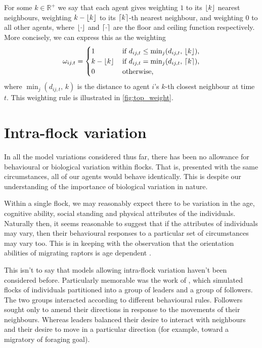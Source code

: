 For some $k\in\mathbb{R}^+$ we say that each agent gives weighting $1$ to its
$\lfloor k\rfloor$ nearest neighbours, weighting $k - \lfloor k\rfloor$ to its $\lceil k\rceil$-th
nearest neighbour, and weighting $0$ to all other agents, where $\lfloor\cdot\rfloor$
and $\lceil\cdot\rceil$ are the floor and ceiling function respectively. More
concisely, we can express this as the weighting
\begin{equation}
    \label{eq:top_interaction}
	\omega_{ij,t} =
	\begin{cases}
		1           & \, \text{if } d_{ij, t} \leq \min_j(d_{ij,t},\, \lfloor k\rfloor), \\
		k-\lfloor k\rfloor & \, \text{if } d_{ij, t} = \min_j(d_{ij,t},\, \lceil k\rceil),     \\
		0           & \, \text{otherwise,}
	\end{cases}
\end{equation}
where $\min_j(d_{ij,t},\, k)$ is the distance to agent $i$'s $k$-th closest
neighbour at time $t$. This weighting rule is illustrated in
\cref{fig:top_weight}.

\section{Intra-flock variation}

In all the model variations considered thus far, there has been no allowance
for behavioural or biological variation within flocks. That is, presented with
the same circumstances, all of our agents would behave identically. This is
despite our understanding of the importance of biological variation in nature.

Within a single flock, we may reasonably expect there to be variation in the
age, cognitive ability, social standing and physical attributes of the
individuals. Naturally then, it seems reasonable to suggest that if the
attributes of individuals may vary, then their behavioural responses to a
particular set of circumstances may vary too. This is in keeping with the
observation that the orientation abilities of migrating raptors is age
dependent \parencite{thorup03}.

This isn't to say that models allowing intra-flock variation haven't been
considered before. Particularly memorable was the work of \textcite{couzin05},
which simulated flocks of individuals partitioned into a group of leaders and a
group of followers. The two groups interacted according to different
behavioural rules. Followers sought only to amend their directions in response
to the movements of their neighbours. Whereas leaders balanced their desire to
interact with neighbours and their desire to move in a particular direction
(for example, toward a migratory of foraging goal).

